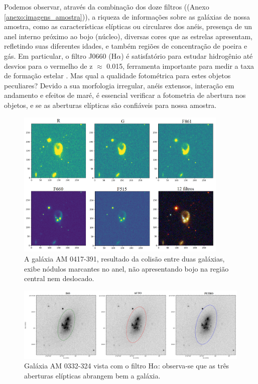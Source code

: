 Podemos observar, através da combinação dos doze filtros ((Anexo \ref{anexo:imagens_amostra})), a riqueza de informações sobre as galáxias de nossa amostra, como as características elípticas ou circulares dos anéis, presença de un anel interno próximo ao bojo (núcleo), diversas cores que as estrelas apresentam, refletindo suas diferentes idades, e também regiões de concentração de poeira e gás. Em particular, o filtro J0660 (H$\alpha$) é satisfatório para estudar hidrogênio até desvios para o vermelho de z $\approx$ 0.015, ferramenta importante para medir a taxa de formação estelar \cite{2022MNRAS.511.4590A}. Mas qual a qualidade fotométrica para estes objetos peculiares? Devido a sua morfologia irregular, anéis extensos, interação em andamento e efeitos de maré, é essencial verificar a fotometria de abertura nos objetos, e se as aberturas elípticas são confiáveis para nossa amostra.

\begin{figure}[!h]
  \centering 
  \includegraphics[width=0.9\textwidth]{Imagens/am0417391.png}
  \caption[Filtros individuais e combinados de AM 0417-391.]{A galáxia AM 0417-391, resultado da colisão entre duas galáxias, exibe nódulos marcantes no anel, não apresentando bojo na região central nem deslocado.}
  \label{fig:am0417391}
\end{figure}

\begin{figure}[!h]
  \centering 
  \includegraphics[width=1.0\textwidth]{Imagens/aberturas_am0332324.png} 
  \caption[Aberturas aplicadas à galáxia AM 0332-324.]{Galáxia AM 0332-324 vista com o filtro H$\alpha$: observa-se que as três aberturas elípticas abrangem bem a galáxia.}
  \label{fig:aberturas_am0332324} 
\end{figure}

